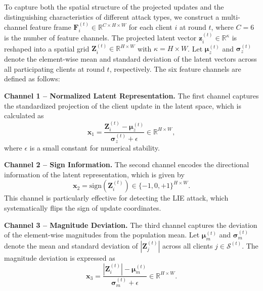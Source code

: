 To capture both the spatial structure of the projected updates and the distinguishing characteristics of different attack types, we construct a multi-channel feature frame $\mathbf{F}_i^{(t)} \in \mathbb{R}^{C \times H \times W}$ for each client $i$ at round $t$, where $C = 6$ is the number of feature channels. The projected latent vector $\mathbf{z}_i^{(t)} \in \mathbb{R}^{\kappa}$ is reshaped into a spatial grid $\mathbf{Z}_i^{(t)} \in \mathbb{R}^{H \times W}$ with $\kappa = H \times W$. Let $\boldsymbol{\mu}_z^{(t)}$ and $\boldsymbol{\sigma}_z^{(t)}$ denote the element-wise mean and standard deviation of the latent vectors across all participating clients at round $t$, respectively. The six feature channels are defined as follows:

\textbf{Channel 1 -- Normalized Latent Representation.} The first channel captures the standardized projection of the client update in the latent space, which is calculated as
\begin{equation}\label{eq:ch1}
    \mathbf{x}_1 = \frac{\mathbf{Z}_i^{(t)} - \boldsymbol{\mu}_z^{(t)}}{\boldsymbol{\sigma}_z^{(t)} + \epsilon} \in \mathbb{R}^{H \times W},
\end{equation}
where $\epsilon$ is a small constant for numerical stability.

\textbf{Channel 2 -- Sign Information.} The second channel encodes the directional information of the latent representation, which is given by
\begin{equation}\label{eq:ch2}
    \mathbf{x}_2 = \text{sign}\left(\mathbf{Z}_i^{(t)}\right) \in \{-1, 0, +1\}^{H \times W}.
\end{equation}
This channel is particularly effective for detecting the LIE attack, which systematically flips the sign of update coordinates.

\textbf{Channel 3 -- Magnitude Deviation.} The third channel captures the deviation of the element-wise magnitudes from the population mean. Let $\boldsymbol{\mu}_m^{(t)}$ and $\boldsymbol{\sigma}_m^{(t)}$ denote the mean and standard deviation of $|\mathbf{Z}_j^{(t)}|$ across all clients $j \in \mathcal{S}^{(t)}$. The magnitude deviation is expressed as
\begin{equation}\label{eq:ch3}
    \mathbf{x}_3 = \frac{|\mathbf{Z}_i^{(t)}| - \boldsymbol{\mu}_m^{(t)}}{\boldsymbol{\sigma}_m^{(t)} + \epsilon} \in \mathbb{R}^{H \times W}.
\end{equation}


